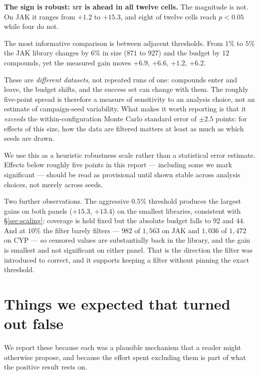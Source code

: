 \documentclass[11pt]{article}
\newcommand{\mt}{\textsc{mt}}
\begin{document}
\textbf{The sign is robust: \mt{} is ahead in all twelve cells.} The magnitude
is not. On JAK it ranges from $+1.2$ to $+15.3$, and eight of twelve cells reach
$p<0.05$ while four do not.

The most informative comparison is between adjacent thresholds. From $1\%$ to
$5\%$ the JAK library changes by $6\%$ in size ($871$ to $927$) and the budget by
$12$ compounds, yet the measured gain moves $+6.9$, $+6.6$, $+1.2$, $+6.2$.

These are \emph{different datasets}, not repeated runs of one: compounds enter
and leave, the budget shifts, and the success set can change with them. The
roughly five-point spread is therefore a measure of sensitivity to an analysis
choice, not an estimate of campaign-seed variability. What makes it worth
reporting is that it \emph{exceeds} the within-configuration Monte Carlo
standard error of $\pm 2.5$ points: for effects of this size, how the data are
filtered matters at least as much as which seeds are drawn.

We use this as a heuristic robustness scale rather than a statistical error
estimate. Effects below roughly five points in this report --- including some we
mark significant --- should be read as provisional until shown stable across
analysis choices, not merely across seeds.

Two further observations. The aggressive $0.5\%$ threshold produces the largest
gains on both panels ($+15.3$, $+13.4$) on the smallest libraries, consistent
with \S\ref{sec:scaling}: coverage is held fixed but the absolute budget falls
to $92$ and $44$. And at $10\%$ the filter barely filters --- $982$ of $1{,}563$
on JAK and $1{,}036$ of $1{,}472$ on CYP --- so censored values are substantially
back in the library, and the gain is smallest and not significant on either
panel. That is the direction the filter was introduced to correct, and it
supports keeping a filter without pinning the exact threshold.

\section{Things we expected that turned out false}
\label{sec:falsified}

We report these because each was a plausible mechanism that a reader might
otherwise propose, and because the effort spent excluding them is part of what
the positive result rests on.
\end{document}
